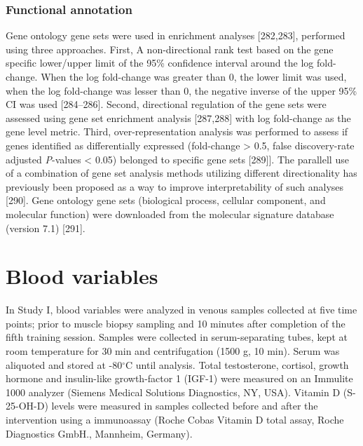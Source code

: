 \documentclass[twoside,10pt]{gihclass} %
\begin{document}
\hypertarget{functional-annotation}{%
\subsubsection{Functional annotation}\label{functional-annotation}}

Gene ontology gene sets were used in enrichment analyses
{[}282,283{]},
performed using three approaches.
First, A non-directional rank test based on the gene specific lower/upper limit of the 95\% confidence interval around the log fold-change. When the log fold-change was greater than 0, the lower limit was used, when the log fold-change was lesser than 0, the negative inverse of the upper 95\% CI was used
{[}284--286{]}.
Second, directional regulation of the gene sets were assessed using gene set enrichment analysis
{[}287,288{]} with log fold-change as the gene level metric.
Third, over-representation analysis was performed to assess if genes identified as differentially expressed (\textbar fold-change\textbar{} \textgreater{} 0.5, false discovery-rate adjusted \emph{P}-values \textless{} 0.05) belonged to specific gene sets
{[}289{]}{]}.
The parallell use of a combination of gene set analysis methods utilizing different directionality has previously been proposed as a way to improve interpretability of such analyses
{[}290{]}.
Gene ontology gene sets (biological process, cellular component, and molecular function) were downloaded from the molecular signature database (version 7.1) {[}291{]}.

\hypertarget{blood-variables}{%
\section{Blood variables}\label{blood-variables}}

In Study I, blood variables were analyzed in venous samples collected at five time points; prior to muscle biopsy sampling and 10 minutes after completion of the fifth training session. Samples were collected in serum-separating tubes, kept at room temperature for 30 min and centrifugation (1500 g, 10 min). Serum was aliquoted and stored at -80\(^{\circ}\)C until analysis.
Total testosterone, cortisol, growth hormone and insulin-like growth-factor 1 (IGF-1) were measured on an Immulite 1000 analyzer (Siemens Medical Solutions Diagnostics, NY, USA). Vitamin D (S-25-OH-D) levels were measured in samples collected before and after the intervention using a immunoassay (Roche Cobas Vitamin D total assay, Roche Diagnostics GmbH., Mannheim, Germany).
\end{document}
